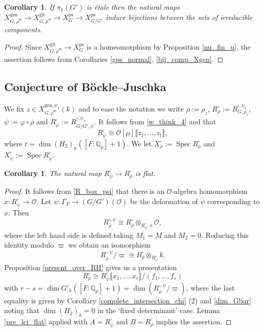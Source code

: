 \documentclass{amsart}
\newtheorem{cor}[prop]{Corollary}
\theoremstyle{definition}
\theoremstyle{remark}
\DeclareMathOperator{\Spec}{Spec}
\newcommand{\Qp}{\mathbb {Q}_p}
\newcommand{\OO}{\mathcal O}
\newcommand{\br}[1]{\llbracket #1\rrbracket}
\newcommand{\rhobar}{\overline{\rho}}
\newcommand{\ps}{\mathrm{ps}}
\newcommand{\gen}{\mathrm{gen}}
\newcommand{\rhobarss}{\rhobar^{\mathrm{ss}}}
\newcommand{\psibar}{\overline{\psi}}
\newcommand{\git}{\mathrm{git}}
\begin{document}
\begin{cor}\label{irr_comp_ps} If $\pi_1(G')$ is \'etale then the natural maps $X^{\gen}_{G,\rhobarss}\rightarrow X^{\git}_{G,\rhobarss}\rightarrow X^{\ps}_G \rightarrow X^{\ps}_{G/G'}$ induce  bijections between 
the sets of irreducible components. 
\end{cor} 
\begin{proof} Since $X^{\git}_{G, \rhobarss}\rightarrow X^{\ps}_{G}$ is 
 a homeomorphism by Proposition \ref{nu_fin_u}, the assertion follows from Corollaries \ref{gps_normal}, \ref{bij_comp_Xgen}.
\end{proof}



\subsection{Conjecture of B\"ockle--Juschka}
We fix $z\in X^{\gen,\psi_1}_{G, \rhobarss}(k)$ and to ease the notation 
we write $\rhobar:=\rho_z$, $R^{\square}_{\rhobar}:= R^{\square,\psi_1}_{G, \rho_z}$, $\psibar:= \varphi\circ \rhobar$ and 
$R^{\square}_{\psibar}:= R^{\square,\psi_1}_{G/G', \psibar}$. It follows from 
\eqref{w_think_4} and  that 
\begin{equation}\label{R_box_psi}
R^{\square}_{\psibar}\cong \OO[\mu]\br{z_1, \ldots, z_t},
\end{equation}
where $t=\dim (H_2)_k ([F:\Qp]+1)$. We let $X^{\square}_{\rhobar}:=\Spec R^{\square}_{\rhobar}$ and 
$X^{\square}_{\psibar}:= \Spec R^{\square}_{\psibar}$.
\begin{cor}\label{flat_det} The natural map $R^{\square}_{\psibar} \rightarrow R^{\square}_{\rhobar}$ 
is flat. 
\end{cor}
\begin{proof} It follows from \eqref{R_box_psi} that there is an $\OO$-algebra homomorphism  $x: R^{\square}_{\psibar}\rightarrow \OO$.
Let $\psi: \Gamma_F \rightarrow (G/G')(\OO)$ be the deformation of 
$\psibar$ corresponding to $x$. Then 
\begin{equation}\label{butz_1}
R^{\square, \psi}_{\rhobar}\cong R^{\square}_{\rhobar}\otimes_{R^{\square}_{\psibar}, x} \OO,
\end{equation}
where the left hand side is defined taking $M_1=M$ and $M_2=0$. Reducing this identity modulo $\varpi$ we obtain an isomorphism 
\begin{equation}\label{butz_2}
R^{\square, \psi}_{\rhobar}/\varpi \cong R^{\square}_{\rhobar}\otimes_{R^{\square}_{\psibar}} k.
\end{equation}
Proposition \ref{present_over_RH} gives us a presentation 
\begin{equation}\label{present_again_chi}
R^{\square}_{\rhobar}\cong R^{\square}_{\psibar}\br{x_1,\ldots, x_r}/(f_1,\ldots, f_s)
\end{equation} 
with $r-s= \dim G'_k ([F:\Qp]+1) = \dim (R^{\square, \psi}_{\rhobar}/\varpi)$, where 
the last equality is given by Corollary \ref{complete_intersection_chi} (2) and \eqref{dim_Gbar} noting that $\dim (H_2)_k=0$ in the `fixed determinant'  case. Lemma \ref{pre_lci_flat} 
applied with $A= R^{\square}_{\psibar}$ and $B=R^{\square}_{\rhobar}$
implies the assertion. 
\end{proof}
\end{document}
